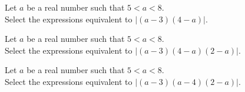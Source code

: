 \documentclass{ximera}
\begin{document}
\begin{exercise}

Let $a$ be a real number such that $5 < a < 8$. \\

Select the expressions equivalent to $|(a-3)(4-a)|$. \\


\begin{multipleChoice}
\end{multipleChoice}


\end{exercise}









\begin{exercise}

Let $a$ be a real number such that $5 < a < 8$. \\

Select the expressions equivalent to $|(a-3)(4-a)(2-a)|$. \\


\begin{multipleChoice}
\end{multipleChoice}


\end{exercise}










\begin{exercise}

Let $a$ be a real number such that $5 < a < 8$. \\

Select the expressions equivalent to $|(a-3)(a-4)(2-a)|$. \\


\begin{multipleChoice}
\end{multipleChoice}


\end{exercise}
\end{document}
